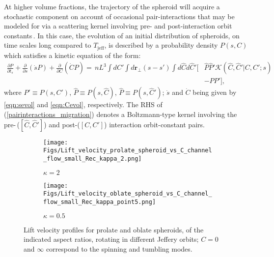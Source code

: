 \documentclass{jfm}
\begin{document}
At higher volume fractions, the trajectory of the spheroid will acquire a stochastic component on account of occasional pair-interactions that may be modeled for via a scattering kernel involving pre- and post-interaction orbit constants\,\citep{navaneethRapids}. In this case, the evolution of an initial distribution of spheroids, on time scales long compared to $T_\text{jeff}$, is described by a probability density $P(s,C)$ which satisfies a kinetic equation of the form:
\begin{align}
\frac{\partial P}{\partial t_s} + \frac{\partial}{\partial s}(\dot{s}P) + \frac{\partial}{\partial C}(\dot{C}P) =\,nL^3\displaystyle\int dC' \displaystyle\int d\bm{r}_\perp (s-s')\displaystyle\int d\hat{C}d\hat{C}'[&\hat{P}\hat{P}'{\mathcal K}(\hat{C},\hat{C}'|C,C';s)\nonumber\\
&- P P'], \label{pairinteractions_migration}
\end{align}
where $P' \equiv P(s,C')$, $\hat{P} \equiv P(s,\hat{C})$, $\hat{P} \equiv P(s,\hat{C}')$; $\dot{s}$ and $\dot{C}$ being given by \eqref{eqn:sevol} and \eqref{eqn:Cevol}, respectively. The RHS of (\ref{pairinteractions_migration}) denotes a Boltzmann-type kernel involving the pre-\,($[\hat{C},\hat{C}']$) and post-($[C,C']$) interaction orbit-constant pairs.

\begin{figure}
	\centering
    \begin{subfigure}[b]{0.49\textwidth}
		\texttt{[image: Figs/Lift\_velocity\_prolate\_spheroid\_vs\_C\_channel\_flow\_small\_Rec\_kappa\_2.png]}
        \caption{$\kappa=2$}
    \end{subfigure}
    \hfill
    \begin{subfigure}[b]{0.49\textwidth}
		\texttt{[image: Figs/Lift\_velocity\_oblate\_spheroid\_vs\_C\_channel\_flow\_small\_Rec\_kappa\_point5.png]}
        \caption{$\kappa=0.5$}
    \end{subfigure}
	\caption{Lift velocity profiles for prolate and oblate spheroids, of the indicated aspect ratios, rotating in different Jeffery orbits; $C=0$ and $\infty$ correspond to the spinning and tumbling modes.}
	\label{fig:Ch3VpvsCorbit}
\end{figure}
\end{document}
